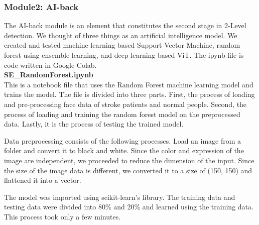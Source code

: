 \subsubsection{Module2: AI-back}
The AI-back module is an element that constitutes the second stage in 2-Level detection. We thought of three things as an artificial intelligence model. We created and tested machine learning based Support Vector Machine, random forest using ensemble learning, and deep learning-based ViT. The ipynb file is code written in Google Colab. \\

\textbf{SE\_RandomForest.ipynb} \\
This is a notebook file that uses the Random Forest machine learning model and trains the model. The file is divided into three parts. First, the process of loading and pre-processing face data of stroke patients and normal people. Second, the process of loading and training the random forest model on the preprocessed data. Lastly, it is the process of testing the trained model.

Data preprocessing consists of the following processes. Load an image from a folder and convert it to black and white. Since the color and expression of the image are independent, we proceeded to reduce the dimension of the input. Since the size of the image data is different, we converted it to a size of (150, 150) and flattened it into a vector.



The model was imported using scikit-learn’s library. The training data and testing data were divided into 80\% and 20\% and learned using the training data. This process took only a few minutes.

